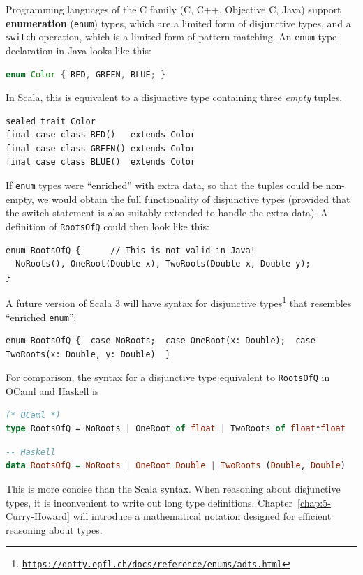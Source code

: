 Programming languages of the C family (C, C++, Objective C, Java)
support \textbf{enumeration} (\lstinline!enum!) types,
which are a limited form of disjunctive types, and a \lstinline!switch!
operation, which is a limited form of pattern-matching. An \lstinline!enum!
type declaration in Java looks like this:
\begin{lstlisting}[language=Java]
enum Color { RED, GREEN, BLUE; } 
\end{lstlisting}
In Scala, this is equivalent to a disjunctive type containing three
\emph{empty} tuples,
\begin{lstlisting}
sealed trait Color
final case class RED()   extends Color
final case class GREEN() extends Color
final case class BLUE()  extends Color
\end{lstlisting}
If \lstinline!enum! types were \textsf{``}enriched\textsf{''} with extra data, so
that the tuples could be non-empty, we would obtain the full functionality
of disjunctive types (provided that the switch statement is also suitably
extended to handle the extra data). A definition of \lstinline!RootsOfQ!
could then look like this: 
\begin{lstlisting}
enum RootsOfQ {      // This is not valid in Java!
  NoRoots(), OneRoot(Double x), TwoRoots(Double x, Double y);
}
\end{lstlisting}
A future version of Scala 3 will have syntax for disjunctive types\footnote{\texttt{\href{https://dotty.epfl.ch/docs/reference/enums/adts.html}{https://dotty.epfl.ch/docs/reference/enums/adts.html}}}
that resembles \textsf{``}enriched \lstinline!enum!\textsf{''}:
\begin{lstlisting}
enum RootsOfQ {  case NoRoots;  case OneRoot(x: Double);  case TwoRoots(x: Double, y: Double)  }
\end{lstlisting}
For comparison, the syntax for a disjunctive type equivalent to \lstinline!RootsOfQ!
in OCaml and Haskell is
\begin{lstlisting}[language=Caml]
(* OCaml *)
type RootsOfQ = NoRoots | OneRoot of float | TwoRoots of float*float
\end{lstlisting}
\begin{lstlisting}[language=Haskell]
-- Haskell
data RootsOfQ = NoRoots | OneRoot Double | TwoRoots (Double, Double)
\end{lstlisting}
This is more concise than the Scala syntax. When reasoning about disjunctive
types, it is inconvenient to write out long type definitions. Chapter~\ref{chap:5-Curry-Howard}
will introduce a mathematical notation designed for efficient reasoning
about types.

